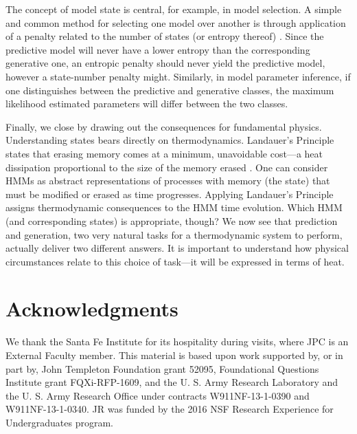 \documentclass[final,nofootinbib,aps,pre,twocolumn,showpacs,groupaddress,preprintnumbers,floatfix]{revtex4-1}
\begin{document}
The concept of model state is central, for example, in model selection. A
simple and common method for selecting one model over another is through
application of a penalty related to the number of states (or entropy thereof)
\cite{Akai77a}. Since the predictive model will never have a lower entropy than
the corresponding generative one, an entropic penalty should never yield the
predictive model, however a state-number penalty might. Similarly, in model
parameter inference, if one distinguishes between the predictive and generative
classes, the maximum likelihood estimated parameters will differ between the
two classes.

Finally, we close by drawing out the consequences for fundamental physics.
Understanding states bears directly on thermodynamics. Landauer's Principle
states that erasing memory comes at a minimum, unavoidable cost---a heat
dissipation proportional to the size of the memory erased \cite{Land61a}. One
can consider HMMs as abstract representations of processes with memory (the
state) that must be modified or erased as time progresses. Applying Landauer's
Principle assigns thermodynamic consequences to the HMM time evolution. Which
HMM (and corresponding states) is appropriate, though? We now see that
prediction and generation, two very natural tasks for a thermodynamic system to
perform, actually deliver two different answers. It is important to understand
how physical circumstances relate to this choice of task---it will be expressed
in terms of heat.

\section*{Acknowledgments}
\label{sec:acknowledgments}

We thank the Santa Fe Institute for its hospitality during visits, where JPC is
an External Faculty member. This material is based upon work supported by, or
in part by, John Templeton Foundation grant 52095, Foundational Questions
Institute grant FQXi-RFP-1609, and the U. S. Army Research Laboratory and the
U. S. Army Research Office under contracts W911NF-13-1-0390 and
W911NF-13-1-0340. JR was funded by the 2016 NSF Research Experience for
Undergraduates program.
\end{document}
